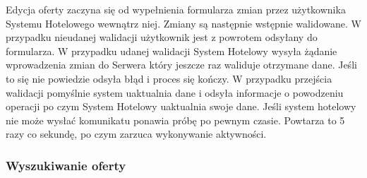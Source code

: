 \documentclass{article}
\begin{document}
\begin{center}
\end{center}

Edycja oferty zaczyna się od wypełnienia formularza zmian przez użytkownika Systemu Hotelowego wewnątrz niej. Zmiany są następnie wstępnie walidowane. W przypadku nieudanej walidacji użytkownik jest z powrotem odsyłany do formularza. W przypadku udanej walidacji System Hotelowy wysyła żądanie wprowadzenia zmian do Serwera który jeszcze raz waliduje otrzymane dane. Jeśli to się nie powiedzie odsyła błąd i proces się kończy. W przypadku przejścia walidacji pomyślnie system uaktualnia dane i odsyła informacje o powodzeniu operacji po czym System Hotelowy uaktualnia swoje dane.
Jeśli system hotelowy nie może wysłać komunikatu ponawia próbę po pewnym czasie. Powtarza to 5 razy co sekundę, po czym zarzuca wykonywanie aktywności.
\subsubsection{Wyszukiwanie oferty}
\end{document}
